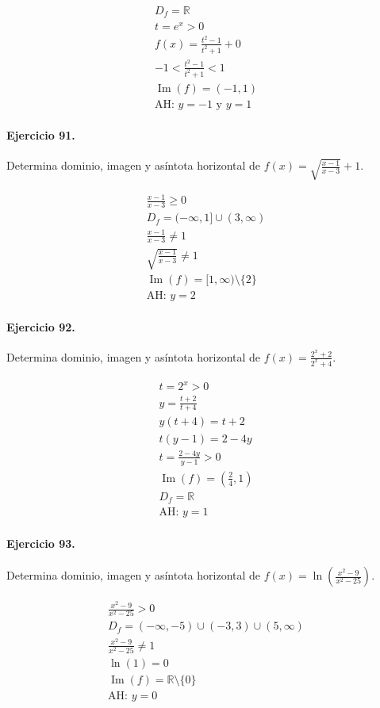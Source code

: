 \documentclass[11pt,a4paper]{article}
\begin{document}
\[
\begin{aligned}
D_f=\mathbb{R}\\
t=e^x>0\\
f(x)=\frac{t^2-1}{t^2+1}+0\\
-1<\frac{t^2-1}{t^2+1}<1\\
\operatorname{Im}(f)=(-1,1)\\
\text{AH: }y=-1\text{ y }y=1
\end{aligned}
\]


\paragraph{Ejercicio 91.} Determina dominio, imagen y asíntota horizontal de $f(x)=\sqrt{\frac{x-1}{x-3}}+1$.

\[
\begin{aligned}
\frac{x-1}{x-3}\ge0\\
D_f=(-\infty,1]\cup(3,\infty)\\
\frac{x-1}{x-3}\ne1\\
\sqrt{\frac{x-1}{x-3}}\ne1\\
\operatorname{Im}(f)=[1,\infty)\setminus\{2\}\\
\text{AH: }y=2
\end{aligned}
\]


\paragraph{Ejercicio 92.} Determina dominio, imagen y asíntota horizontal de $f(x)=\frac{2^x+2}{2^x+4}$. 

\[
\begin{aligned}
t=2^x>0\\
y=\frac{t+2}{t+4}\\
y(t+4)=t+2\\
t(y-1)=2-4y\\
t=\frac{2-4y}{y-1}>0\\
\operatorname{Im}(f)=(\frac{2}{4},1)\\
D_f=\mathbb{R}\\
\text{{AH: }}y=1
\end{aligned}
\]


\paragraph{Ejercicio 93.} Determina dominio, imagen y asíntota horizontal de $f(x)=\ln\left(\frac{x^2-9}{x^2-25}\right)$.

\[
\begin{aligned}
\frac{x^2-9}{x^2-25} >0\\
D_f=(-\infty,-5)\cup(-3,3)\cup(5,\infty)\\
\frac{x^2-9}{x^2-25}\ne1\\
\ln(1)=0\\
\operatorname{Im}(f)=\mathbb{R}\setminus\{0\}\\
\text{{AH: }}y=0
\end{aligned}
\]
\end{document}
